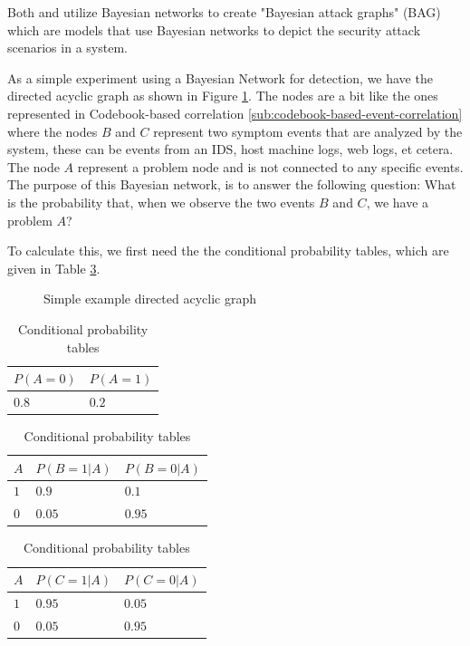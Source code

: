 Both \cite{Kavousi_2014} and \cite{Qin_2004} utilize Bayesian networks to create "Bayesian attack graphs" (BAG) which are models that use Bayesian networks to depict the security attack scenarios in a system.

As a simple experiment using a Bayesian Network for detection, we have the directed acyclic graph as shown in Figure \ref{fig:simple-directed-acyclic-graph}. The nodes are a bit like the ones represented in Codebook-based correlation \ref{sub:codebook-based-event-correlation} where the nodes $B$ and $C$ represent two symptom events that are analyzed by the system, these can be events from an IDS, host machine logs, web logs, et cetera. The node $A$ represent a problem node and is not connected to any specific events. The purpose of this Bayesian network, is to answer the following question: What is the probability that, when we observe the two events $B$ and $C$, we have a problem $A$?

To calculate this, we first need the the conditional probability tables, which are given in Table \ref{tab:probabability-tables}.

\begin{figure}[ht]
\centering
{}
\caption{Simple example directed acyclic graph}
\label{fig:simple-directed-acyclic-graph}
\end{figure}

\begin{table}[ht]
\centering
\begin{tabular}{|l|l|}
\hline
$P(A = 0)$ & $P(A = 1)$ \\ \hline
$0.8$ & $0.2$ \\ \hline
\end{tabular}
\begin{tabular}{|l|l|l|}
\hline
$A$ & $P(B = 1|A)$ & $P(B = 0|A)$ \\ \hline
$1$ & $0.9$ & $0.1$ \\ \hline
$0$ & $0.05$ & $0.95$ \\ \hline
\end{tabular}
\centering
\begin{tabular}{|l|l|l|}
\hline
$A$ & $P(C = 1|A)$ & $P(C = 0|A)$ \\ \hline
$1$ & $0.95$ & $0.05$ \\ \hline
$0$ & $0.05$ & $0.95$ \\ \hline
\end{tabular}
\caption{Conditional probability tables}
\label{tab:probabability-tables}
\end{table}

